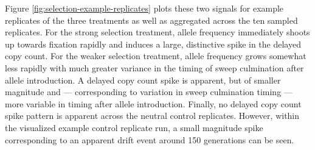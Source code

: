 Figure \ref{fig:selection-example-replicates} plots these two signals for example replicates of the three treatments as well as aggregated across the ten sampled replicates.
For the strong selection treatment, allele frequency immediately shoots up towards fixation rapidly and induces a large, distinctive spike in the delayed copy count.
For the weaker selection treatment, allele frequency grows somewhat less rapidly with much greater variance in the timing of sweep culmination after allele introduction.
A delayed copy count spike is apparent, but of smaller magnitude and --- corresponding to variation in sweep culmination timing --- more variable in timing after allele introduction.
Finally, no delayed copy count spike pattern is apparent across the neutral control replicates.
However, within the visualized example control replicate run, a small magnitude spike corresponding to an apparent drift event around 150 generations can be seen.




